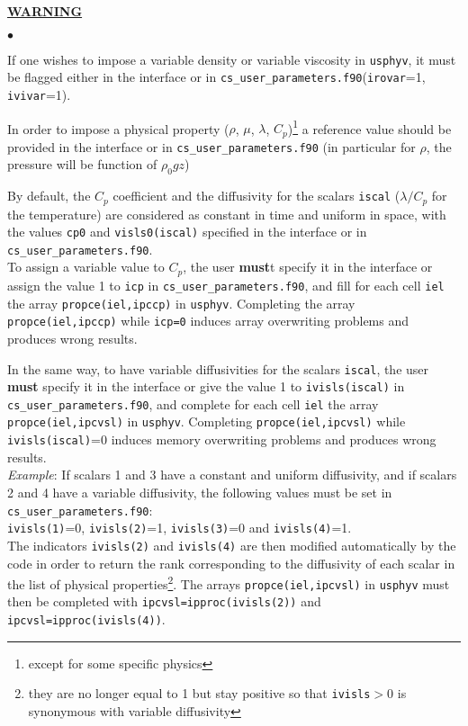 {{{{\bf \underline{WARNING}}\label{prg_propvar}%
\begin{list}{$\bullet$}{}
\item If one wishes to impose a variable density or variable viscosity in
      \texttt{usphyv}, it must be flagged either in the interface or in
      \texttt{cs\_user\_parameters.f90}(\texttt{irovar}=1, \texttt{ivivar}=1).
\item In order to impose a physical property ($\rho$, $\mu$,
      $\lambda$, $C_p$)\footnote{except for some specific physics} a reference
      value should be provided in the interface or in \texttt{cs\_user\_parameters.f90} (in
      particular for $\rho$, the pressure will be function of $\rho_0 gz$)
\item By default, the $C_p$ coefficient and the
      diffusivity for the scalars \texttt{iscal} ($\lambda/C_p$ for the
      temperature) are considered as constant in time and uniform in
      space, with the values \texttt{cp0} and \texttt{visls0(iscal)}
      specified in the interface or in \texttt{cs\_user\_parameters.f90}.\\
To assign a variable value to $C_p$, the user \textbf{must}t specify it in the
      interface or assign the value 1 to \texttt{icp} in \texttt{cs\_user\_parameters.f90},
      and fill for each cell \texttt{iel} the array
      \texttt{propce(iel,ipccp)} in \texttt{usphyv}. Completing the array
      \texttt{propce(iel,ipccp)} while \texttt{icp=0} induces array
      overwriting problems and produces wrong results.

\item In the same way, to have variable diffusivities for the scalars
      \texttt{iscal}, the user \textbf{must} specify it in the interface or give the value
      1 to \texttt{ivisls(iscal)} in \texttt{cs\_user\_parameters.f90}, and complete for each cell
      \texttt{iel} the array \texttt{propce(iel,ipcvsl)} in \texttt{usphyv}.
      Completing \texttt{propce(iel,ipcvsl)} while \texttt{ivisls(iscal)}=0
      induces memory overwriting problems and produces wrong results.\\

{\em Example}: If scalars 1 and 3 have a constant and uniform
      diffusivity, and if scalars 2 and 4 have a variable diffusivity,
      the following values must be set in \texttt{cs\_user\_parameters.f90}: \\
      \texttt{ivisls(1)}=0, \texttt{ivisls(2)}=1, \texttt{ivisls(3)}=0
      and \texttt{ivisls(4)}=1. \\
      The indicators \texttt{ivisls(2)} and \texttt{ivisls(4)} are then
      modified automatically by the code in order to return the rank
      corresponding to the diffusivity of each scalar in the list of physical
      properties\footnote{they are no longer equal to 1 but stay positive
      so that \texttt{ivisls}$>$0 is synonymous with variable diffusivity}.
      The arrays \mbox{\texttt{propce(iel,ipcvsl)}} in \texttt{usphyv} must
      then be completed with \texttt{ipcvsl=ipproc(ivisls(2))} and
      \texttt{ipcvsl=ipproc(ivisls(4))}. \\


\end{list}}}}

